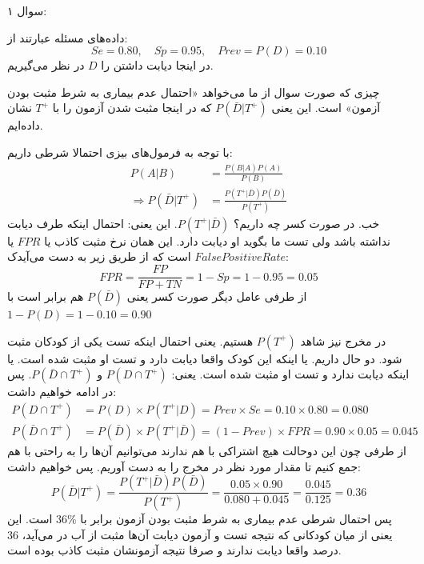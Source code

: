 \documentclass[12pt, answers]{exam}
\renewenvironment{solution}{%
  \par
  \begin{tcolorbox}[
    breakable,                
    colback=white,
    colframe=black,
    arc=1pt,
    boxrule=0.6pt,
    left=4mm, right=4mm,
    top=2mm, bottom=2mm,
    before skip=10pt,
    after skip=10pt,
    segmentation style={solid, black}, 
    before upper={\noindent\textbf{\color{blue}پاسخ:}\par\vspace{0.5em}}
  ]
 }
{%
  \end{tcolorbox}
  \vspace{1em}
}
\begin{document}
\begin{questions}
    \question سوال ۱:

    \begin{solution}
        داده‌های مسئله عبارتند از:
        $$Se = 0.80, \quad Sp = 0.95, \quad Prev = P(D) = 0.10$$
        در اینجا دیابت داشتن را $D$ در نظر می‌گیریم.

        چیزی که صورت سوال از ما می‌خواهد «احتمال عدم بیماری به شرط مثبت بودن آزمون»
        است. این یعنی
        $P(\bar{D} | T^+)$
        که در اینجا مثبت شدن آزمون را با
        $T^+$
        نشان داده‌ایم.

        با توجه به فرمول‌های بیزی احتمالا شرطی داریم:
        \begin{align*}
            P(A | B)                     & = \frac{P(B | A) P(A)}{P(B)}                 \\
            \Rightarrow P(\bar{D} | T^+) & = \frac{P(T^+ | \bar{D}) P(\bar{D})}{P(T^+)}
        \end{align*}
        خب. در صورت کسر چه داریم؟
        $P(T^+|\bar{D})$.
        این یعنی: احتمال اینکه طرف دیابت نداشته باشد ولی تست ما بگوید او دیابت دارد.
        این همان نرخ مثبت کاذب یا $FPR$ یا $False Positive Rate$ است که از طریق زیر به دست می‌آیدک:
        $$FPR = \frac{FP}{FP + TN} = 1 - Sp = 1 - 0.95 = 0.05$$
        از طرفی عامل دیگر صورت کسر یعنی $P(\bar{D})$
        هم برابر است با $1 - P(D) = 1 - 0.10 = 0.90$

        در مخرج نیز شاهد
        $P(T^+)$
        هستیم. یعنی احتمال اینکه تست یکی از کودکان مثبت شود.
        دو حال داریم. یا اینکه این کودک واقعا دیابت دارد و تست  او مثبت شده است. یا اینکه
        دیابت ندارد و تست او مثبت شده است. یعنی:
        $P(D \cap T^+)$
        و
        $P(\bar{D} \cap T^+)$.
        پس در ادامه خواهیم داشت:
        \begin{align*}
            P(D \cap T^+)       & = P(D) \times P(T^+ | D)  = Prev \times Se = 0.10 \times 0.80 = 0.080                   \\
            P(\bar{D} \cap T^+) & = P(\bar{D}) \times P(T^+ | \bar{D}) = (1 - Prev) \times FPR = 0.90 \times 0.05 = 0.045
        \end{align*}
        از طرفی چون این دوحالت هیچ اشتراکی با هم ندارند می‌توانیم آن‌ها را به راحتی با هم جمع کنیم
        تا مقدار مورد نظر در مخرج را به دست آوریم.
        پس خواهیم داشت:
        $$P(\bar{D} | T^+) = \frac{P(T^+ | \bar{D}) P(\bar{D})}{P(T^+)} = \frac{0.05 \times 0.90}{0.080 + 0.045} = \frac{0.045}{0.125} = 0.36 $$
        پس احتمال شرطی عدم بیماری به شرط مثبت بودن آزمون برابر با
        $36\%$
        است. این یعنی از میان کودکانی که نتیجه تست و آزمون دیابت آن‌ها مثبت از آب در می‌آید،
        $36$ درصد واقعا دیابت ندارند و صرفا نتیجه آزمونشان مثبت کاذب بوده است.


\end{solution}
\end{questions}
\end{document}

